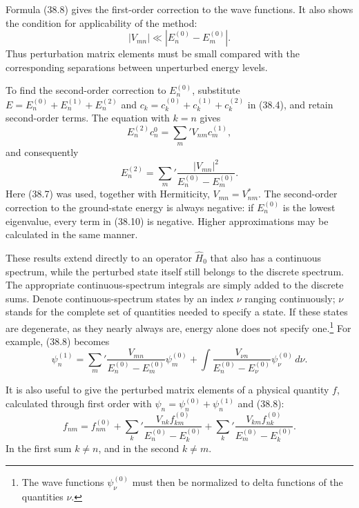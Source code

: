 Formula (38.8) gives the first-order correction to the wave functions. It also
shows the condition for applicability of the method:
\begin{equation}
  |V_{mn}|\ll|E_n^{(0)}-E_m^{(0)}|.
  \tag{38.9}
\end{equation}
Thus perturbation matrix elements must be small compared with the
corresponding separations between unperturbed energy levels.

To find the second-order correction to $E_n^{(0)}$, substitute
$E=E_n^{(0)}+E_n^{(1)}+E_n^{(2)}$ and
$c_k=c_k^{(0)}+c_k^{(1)}+c_k^{(2)}$ in (38.4), and retain second-order terms.
The equation with $k=n$ gives
\[
  E_n^{(2)}c_n^0=\sum_m'V_{nm}c_m^{(1)},
\]
and consequently
\begin{equation}
  E_n^{(2)}=\sum_m'\frac{|V_{mn}|^2}{E_n^{(0)}-E_m^{(0)}}.
  \tag{38.10}
\end{equation}
Here (38.7) was used, together with Hermiticity,
$V_{mn}=V_{nm}^*$.
The second-order correction to the ground-state energy is always negative:
if $E_n^{(0)}$ is the lowest eigenvalue, every term in (38.10) is negative.
Higher approximations may be calculated in the same manner.

These results extend directly to an operator $\hat H_0$ that also has a
continuous spectrum, while the perturbed state itself still belongs to the
discrete spectrum. The appropriate continuous-spectrum integrals are simply
added to the discrete sums. Denote continuous-spectrum states by an index
$\nu$ ranging continuously; $\nu$ stands for the complete set of quantities
needed to specify a state. If these states are degenerate, as they nearly
always are, energy alone does not specify one.\footnote{The wave functions
$\psi_\nu^{(0)}$ must then be normalized to delta functions of the quantities
$\nu$.} For example, (38.8) becomes
\begin{equation}
  \psi_n^{(1)}=\sum_m'\frac{V_{mn}}{E_n^{(0)}-E_m^{(0)}}\psi_m^{(0)}
  +\int\frac{V_{\nu n}}{E_n^{(0)}-E_\nu^{(0)}}\psi_\nu^{(0)}\,d\nu.
  \tag{38.11}
\end{equation}

It is also useful to give the perturbed matrix elements of a physical
quantity $f$, calculated through first order with
$\psi_n=\psi_n^{(0)}+\psi_n^{(1)}$ and (38.8):
\begin{equation}
  f_{nm}=f_{nm}^{(0)}
  +\sum_k'\frac{V_{nk}f_{km}^{(0)}}{E_n^{(0)}-E_k^{(0)}}
  +\sum_k'\frac{V_{km}f_{nk}^{(0)}}{E_m^{(0)}-E_k^{(0)}}.
  \tag{38.12}
\end{equation}
In the first sum $k\ne n$, and in the second $k\ne m$.

